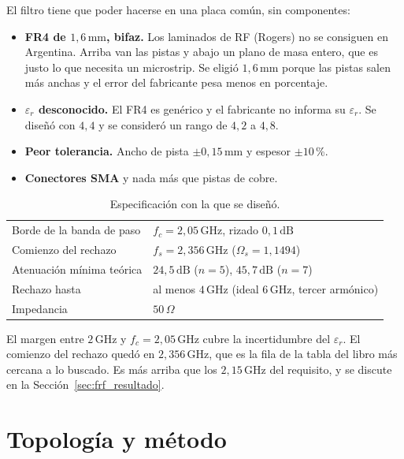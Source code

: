El filtro tiene que poder hacerse en una placa común, sin componentes:
\begin{itemize}
  \item \textbf{FR4 de $1{,}6\,\text{mm}$, bifaz.} Los laminados de RF (Rogers)
    no se consiguen en Argentina. Arriba van las pistas y abajo un plano de
    masa entero, que es justo lo que necesita un microstrip. Se eligió
    $1{,}6\,\text{mm}$ porque las pistas salen más anchas y el error del
    fabricante pesa menos en porcentaje.
  \item \textbf{$\varepsilon_r$ desconocido.} El FR4 es genérico y el
    fabricante no informa su $\varepsilon_r$. Se diseñó con $4{,}4$ y se
    consideró un rango de $4{,}2$ a $4{,}8$.
  \item \textbf{Peor tolerancia.} Ancho de pista $\pm 0{,}15\,\text{mm}$ y
    espesor $\pm 10$\,\%.
  \item \textbf{Conectores SMA} y nada más que pistas de cobre.
\end{itemize}

\begin{table}[htbp]
  \centering
  \caption{Especificación con la que se diseñó.}
  \label{tab:frf_spec}
  \begin{tabular}{ll}
    \toprule
    Borde de la banda de paso & $f_c = 2{,}05\,\text{GHz}$, rizado $0{,}1\,\text{dB}$ \\
    Comienzo del rechazo & $f_s = 2{,}356\,\text{GHz}$ ($\Omega_s = 1{,}1494$) \\
    Atenuación mínima teórica & $24{,}5\,\text{dB}$ ($n = 5$), $45{,}7\,\text{dB}$ ($n = 7$) \\
    Rechazo hasta & al menos $4\,\text{GHz}$ (ideal $6\,\text{GHz}$, tercer armónico) \\
    Impedancia & $50\,\Omega$ \\
    \bottomrule
  \end{tabular}
\end{table}

El margen entre $2\,\text{GHz}$ y $f_c = 2{,}05\,\text{GHz}$ cubre la
incertidumbre del $\varepsilon_r$. El comienzo del rechazo quedó en
$2{,}356\,\text{GHz}$, que es la fila de la tabla del libro más cercana a
lo buscado. Es más arriba que los $2{,}15\,\text{GHz}$ del requisito, y se
discute en la Sección~\ref{sec:frf_resultado}.

\section{Topología y método}
\label{sec:frf_metodo}

